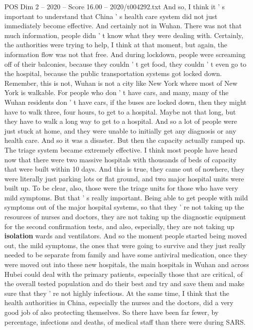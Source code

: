 \begin{textsample}{POS Dim 2 – 2020 – Score 16.00 – 2020/t004292.txt}
And so, I think it ' s important to understand that China ' s health care system did not just immediately become effective.
And certainly not in Wuhan.
There was not that much information, people didn ' t know what they were dealing with.
Certainly, the authorities were trying to help, I think at that moment, but again, the information flow was not that free.
And during lockdown, people were screaming off of their balconies, because they couldn ' t get food, they couldn ' t even go to the hospital, because the public transportation systems got locked down.
Remember, this is not, Wuhan is not a city like New York where most of New York is walkable.
For people who don ' t have cars, and many, many of the Wuhan residents don ' t have cars, if the buses are locked down, then they might have to walk three, four hours, to get to a hospital.
Maybe not that long, but they have to walk a long way to get to a hospital.
And so a lot of people were just stuck at home, and they were unable to initially get any diagnosis or any health care.
And so it was a disaster.
But then the capacity actually ramped up.
The triage system became extremely effective.
I think most people have heard now that there were two massive hospitals with thousands of beds of capacity that were built within 10 days.
And this is true, they came out of nowhere, they were literally just parking lots or flat ground, and two major hospital units were built up.
To be clear, also, those were the triage units for those who have very mild symptoms.
But that ' s really important.
Being able to get people with mild symptoms out of the major hospital systems, so that they ' re not taking up the resources of nurses and doctors, they are not taking up the diagnostic equipment for the second confirmation tests, and also, especially, they are not taking up \textbf{isolation} wards and ventilators.
And so the moment people started being moved out, the mild symptoms, the ones that were going to survive and they just really needed to be separate from family and have some antiviral medication, once they were moved out into these new hospitals, the main hospitals in Wuhan and across Hubei could deal with the primary patients, especially those that are critical, of the overall tested population and do their best and try and save them and make sure that they ' re not highly infectious.
At the same time, I think that the health authorities in China, especially the nurses and the doctors, did a very good job of also protecting themselves.
So there have been far fewer, by percentage, infections and deaths, of medical staff than there were during SARS.

\end{textsample}
